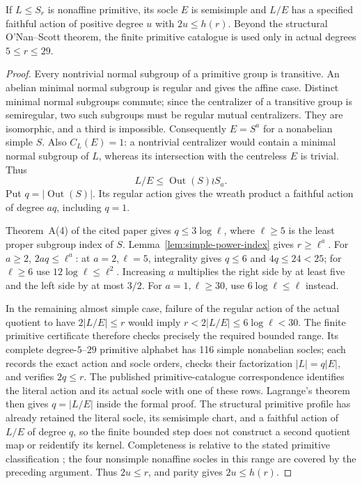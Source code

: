 \begin{theorem}\label{thm:primitive-compression}
If $L\leq S_r$ is nonaffine primitive, its socle $E$ is semisimple
and $L/E$ has a specified faithful action of positive degree $u$
with $2u\leq h(r)$. Beyond the structural O'Nan--Scott theorem,
the finite primitive catalogue is used only in actual degrees
$5\leq r\leq29$.
\end{theorem}
\begin{proof}
Every nontrivial normal subgroup of a primitive group is transitive.
An abelian minimal normal subgroup is regular and gives the affine
case. Distinct minimal normal subgroups commute; since the centralizer
of a transitive group is semiregular, two such subgroups must be regular
mutual centralizers. They are isomorphic, and a third is impossible.
Consequently $E=S^a$ for a nonabelian simple $S$. Also $C_L(E)=1$:
a nontrivial centralizer would contain a minimal normal subgroup of
$L$, whereas its intersection with the centreless $E$ is trivial.
Thus
\[
 L/E\leq\operatorname{Out}(S)\wr S_a.
\]
Put $q=|\operatorname{Out}(S)|$. Its regular action gives the wreath
product a faithful action of degree $aq$, including $q=1$.

Theorem~A(4) of the cited paper gives $q\leq3\log\ell$, where
$\ell\geq5$ is the least proper subgroup index of $S$.
Lemma~\ref{lem:simple-power-index} gives $r\geq\ell^a$.
For $a\geq2$, $2aq\leq\ell^a$: at $a=2,\ell=5$, integrality
gives $q\leq6$ and $4q\leq24<25$; for $\ell\geq6$ use
$12\log\ell\leq\ell^2$. Increasing $a$ multiplies the right side
by at least five and the left side by at most $3/2$.
For $a=1,\ell\geq30$, use $6\log\ell\leq\ell$ instead.

In the remaining almost simple case, failure of the regular action
of the actual quotient to have $2|L/E|\leq r$ would imply
$r<2|L/E|\leq6\log\ell<30$. The finite primitive certificate
therefore checks precisely the required bounded range. Its complete
degree-$5$--$29$ primitive alphabet has 116 simple nonabelian socles;
each records the exact action and socle orders, checks their factorization
$|L|=q|E|$, and verifies $2q\leq r$.  The published primitive-catalogue
correspondence identifies the literal action and its actual socle with one
of these rows.  Lagrange's theorem then gives $q=|L/E|$ inside the formal
proof.  The structural primitive profile has already retained
the literal socle, its semisimple chart, and a faithful action of
$L/E$ of degree $q$, so the finite bounded step does not construct a
second quotient map or reidentify its kernel.  Completeness is relative
to the stated primitive classification
\cite{RoneyDougal2005Primitive,PrimGrp344}; the four nonsimple
nonaffine socles in this range are covered by the preceding argument.
Thus $2u\leq r$, and parity gives $2u\leq h(r)$.
\end{proof}

